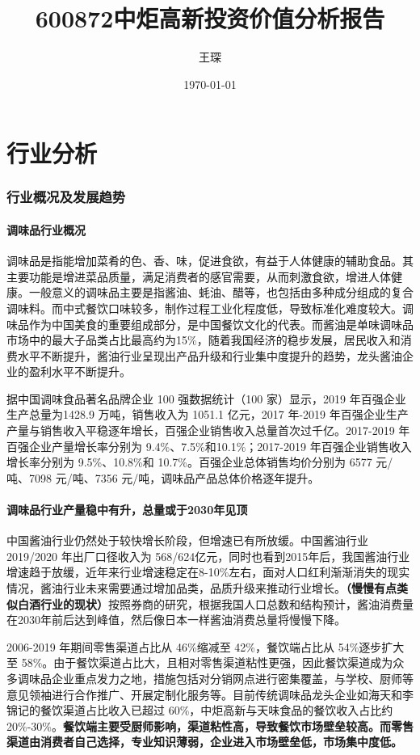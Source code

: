 \documentclass[UTF8,a4paper,zihao=-4,fontset = windows]{ctexart} %
\title{\textbf{600872中炬高新投资价值分析报告}} %
\author{王琛}
\date{\today}
\begin{document}
\maketitle
\tableofcontents
\part{行业分析}
\section{行业概况及发展趋势}
\subsection{调味品行业概况}
调味品是指能增加菜肴的色、香、味，促进食欲，有益于人体健康的辅助食品。其主要功能是增进菜品质量，满足消费者的感官需要，从而刺激食欲，增进人体健康。一般意义的调味品主要是指酱油、蚝油、醋等，也包括由多种成分组成的复合调味料。而中式餐饮口味较多，制作过程工业化程度低，导致标准化难度较大。调味品作为中国美食的重要组成部分，是中国餐饮文化的代表。而酱油是单味调味品市场中的最大子品类占比最高约为15\%，随着我国经济的稳步发展，居民收入和消费水平不断提升，酱油行业呈现出产品升级和行业集中度提升的趋势，龙头酱油企业的盈利水平不断提升。

据中国调味食品著名品牌企业 100 强数据统计（100 家）显示，2019 年百强企业生产总量为1428.9 万吨，销售收入为 1051.1 亿元，2017 年-2019 年百强企业生产产量与销售收入平稳逐年增长，百强企业销售收入总量首次过千亿。2017-2019 年百强企业产量增长率分别为 9.4\%、7.5\%和10.1\%；2017-2019 年百强企业销售收入增长率分别为 9.5\%、10.8\%和 10.7\%。百强企业总体销售均价分别为 6577 元/吨、7098 元/吨、7356 元/吨，调味品产品总体价格逐年提升。

\subsection{调味品行业产量稳中有升，总量或于2030年见顶}
中国酱油行业仍然处于较快增长阶段，但增速已有所放缓。中国酱油行业 2019/2020 年出厂口径收入为 568/624亿元，同时也看到2015年后，我国酱油行业增速趋于放缓，近年来行业增速稳定在8-10\%左右，面对人口红利渐渐消失的现实情况，酱油行业未来需要通过增加品类，品质升级来推动行业增长。\textbf{（慢慢有点类似白酒行业的现状）}按照券商的研究，根据我国人口总数和结构预计，酱油消费量在2030年前后达到峰值，然后像日本一样酱油消费总量将慢慢下降。%

2006-2019 年期间零售渠道占比从 46\%缩减至 42\%，餐饮端占比从 54\%逐步扩大至 58\%。由于餐饮渠道占比大，且相对零售渠道粘性更强，因此餐饮渠道成为众多调味品企业重点发力之地，措施包括对分销网点进行密集覆盖，与学校、厨师等意见领袖进行合作推广、开展定制化服务等。目前传统调味品龙头企业如海天和李锦记的餐饮渠道占比收入已超过 60\%，中炬高新与天味食品的餐饮收入占比约 20\%-30\%。\textbf{餐饮端主要受厨师影响，渠道粘性高，导致餐饮市场壁垒较高。而零售渠道由消费者自己选择，专业知识薄弱，企业进入市场壁垒低，市场集中度低。}
\end{document}
